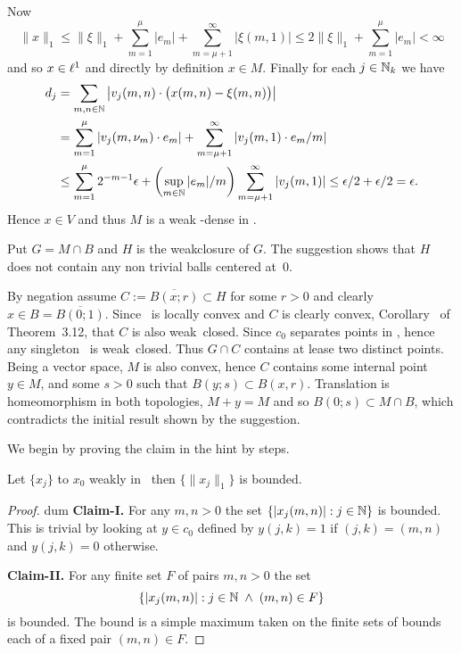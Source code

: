 \begin{enumerate}
\begin{itemize}
Now
\begin{equation*}
\|x\|_1
 \leq \|\xi\|_1 + \sum_{m=1}^\mu |e_m| + \sum_{m=\mu+1}^\infty |\xi(m,1)|
 \leq 2\|\xi\|_1 + \sum_{m=1}^\mu |e_m|
 < \infty
\end{equation*}
and so \(x\in\ell^1\) and directly by definition \(x\in M\).
Finally for each \(j\in\mathbb{N}_k\) we have
\begin{align*}
d_j
&=
\sum_{m,n\in\mathbb{N}} \left| v_j(m,n) \cdot \bigl(x(m,n) - \xi(m,n)\bigr) \right| \\
&=   \sum_{m=1}^\mu | v_j(m,\nu_m)\cdot e_m |
  + \sum_{m=\mu+1}^\infty  |v_j(m,1) \cdot e_m/m | \\
&\leq \sum_{m=1}^\mu  2^{-m-1}\epsilon
    + \left(\sup_{m\in\mathbb{N}} |e_m|/m\right)\sum_{m=\mu+1}^\infty  |v_j(m,1)|
 \leq \epsilon/2 + \epsilon/2 = \epsilon.
\end{align*}
Hence \(x\in V\) and thus $M$ is a weak \upstar-dense in \ellone.

Put \(G = M \cap B\) and $H$ is the weak\upstar closure of $G$.
The suggestion shows that $H$ does not contain any non trivial balls
 centered at~$0$.

By negation assume \(C := \overline{B(x;r)} \subset H\) for some \(r>0\)
and clearly \(x\in B = \overline{B(0;1)}\).
Since \ellone\ is locally convex and $C$ is clearly convex,
Corollary~ of Theorem~3.12, that $C$ is also weak\upstar\ closed.
Since \(c_0\) separates points in \ellone, hence any singleton \ellone\
is weak\upstar\ closed. Thus \(G\cap C\) contains at lease two distinct points.
Being a vector space, $M$ is also convex, hence $C$ contains some
internal point \(y\in M\), and some \(s>0\) such that
\(B(y;s) \subset B(x,r)\).
Translation is homeomorphism in both topologies, \(M + y = M\) and
so \(B(0;s) \subset M \cap B\), which contradicts the initial result
shown by the suggestion.

We begin by proving the claim in the hint by steps.

\begin{llem}
Let \(\{x_j\}\) to \(x_0\) weakly in \ellone\ then
  \(\{\|x_j\|_1\}\) is bounded.
\end{llem}
\begin{proof}
{\nullfont dum}
\newline
\textbf{Claim-I.}
For any \(m,n>0\) the set \(\{|x_j(m,n)|: j\in\mathbb{N}\}\)  is bounded.
This is trivial by looking at \(y\in c_0\) defined by \(y(j,k)=1\)
if \((j,k)=(m,n)\) and \(y(j,k)=0\) otherwise.

\textbf{Claim-II.}
For any finite set $F$ of pairs
\(m,n>0\) the set
\begin{equation*}
\{|x_j(m,n)|: j\in\mathbb{N}\;\land\; (m,n)\in F\}
\end{equation*}
is bounded.
\newline
The bound is a simple maximum taken on the finite sets of
bounds each of a fixed pair \((m,n)\in F\).


\end{proof}
\end{itemize}
\end{enumerate}
